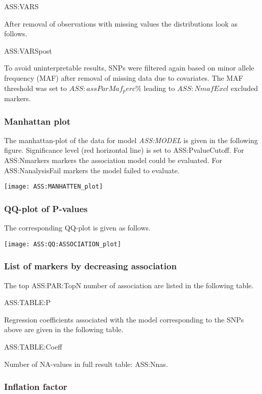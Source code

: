 ASS:VARS

After removal of observations with missing values the distributions look as follows.

ASS:VARSpost

To avoid uninterpretable results, SNPs were filtered again based on minor allele frequency (MAF) after removal of missing data due to covariates. The MAF threshold was set to $ASS:assParMaf_perc\%$ leading to $ASS:NmafExcl$ excluded markers.

\subsubsection{Manhattan plot}

The manhattan-plot of the data for model \emph{ASS:MODEL} is given in the following figure. Significance level (red horizontal line) is set to ASS:PvalueCutoff. For ASS:Nmarkers markers the association model could be evaluated. For ASS:NanalysisFail markers the model failed to evaluate.

\begin{center}
	\texttt{[image: ASS:MANHATTEN\_plot]}
\end{center}

\subsubsection{QQ-plot of P-values}

The corresponding QQ-plot is given as follows.

\begin{center}
	\texttt{[image: ASS:QQ:ASSOCIATION\_plot]}
\end{center}

\subsubsection{List of markers by decreasing association}

The top ASS:PAR:TopN number of association are listed in the following table.

ASS:TABLE:P

Regression coefficients associated with the model corresponding to the SNPs above are given in the following table.

ASS:TABLE:Coeff

Number of NA-values in full result table: ASS:Nnas.

\subsubsection{Inflation factor}

